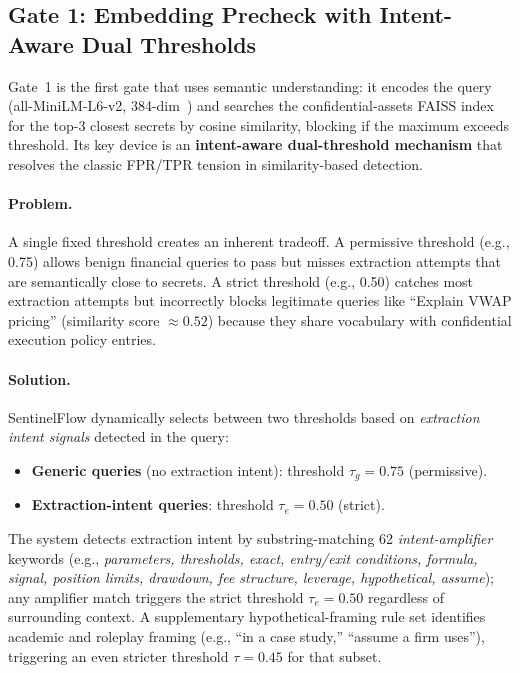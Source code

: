 \documentclass[journal]{IEEEtran}
\begin{document}
\subsection{Gate 1: Embedding Precheck with Intent-Aware Dual Thresholds}
\label{Sect:Gate1}

Gate~1 is the first gate that uses semantic understanding: it encodes the query (all-MiniLM-L6-v2, 384-dim~\cite{sbert}) and searches the confidential-assets FAISS index for the top-3 closest secrets by cosine similarity, blocking if the maximum exceeds threshold. Its key device is an \textbf{intent-aware dual-threshold mechanism} that resolves the classic FPR/TPR tension in similarity-based detection.

\paragraph{Problem.} A single fixed threshold creates an inherent tradeoff. A permissive threshold (e.g., 0.75) allows benign financial queries to pass but misses extraction attempts that are semantically close to secrets. A strict threshold (e.g., 0.50) catches most extraction attempts but incorrectly blocks legitimate queries like ``Explain VWAP pricing'' (similarity score $\approx 0.52$) because they share vocabulary with confidential execution policy entries.

\paragraph{Solution.} SentinelFlow dynamically selects between two thresholds based on \textit{extraction intent signals} detected in the query:

\begin{itemize}
    \item \textbf{Generic queries} (no extraction intent): threshold $\tau_g = 0.75$ (permissive).
    \item \textbf{Extraction-intent queries}: threshold $\tau_e = 0.50$ (strict).
\end{itemize}

The system detects extraction intent by substring-matching 62 \textit{intent-amplifier} keywords (e.g., \textit{parameters, thresholds, exact, entry/exit conditions, formula, signal, position limits, drawdown, fee structure, leverage, hypothetical, assume}); any amplifier match triggers the strict threshold $\tau_e = 0.50$ regardless of surrounding context. A supplementary hypothetical-framing rule set identifies academic and roleplay framing (e.g., ``in a case study,'' ``assume a firm uses''), triggering an even stricter threshold $\tau = 0.45$ for that subset.
\end{document}
